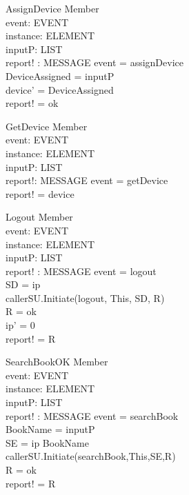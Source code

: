 \begin{schema}{AssignDevice}
\Delta Member \\ 
event: EVENT \\
instance: ELEMENT \\
inputP: LIST \\
report! : MESSAGE 
\where event = assignDevice \\
DeviceAssigned = \head inputP \\
device' = DeviceAssigned \\
report! = ok 
\end{schema}

\begin{schema}{GetDevice}
\Delta Member \\ 
event: EVENT \\
instance: ELEMENT \\
inputP: LIST \\
report!: MESSAGE
\where event = getDevice \\
report! = device 
\end{schema}

\begin{schema}{Logout}
\Delta Member \\ 
event: EVENT \\
instance: ELEMENT \\
inputP: LIST \\
report! : MESSAGE 
\where event = logout \\
SD = \lseq ip \rseq \\
callerSU.Initiate(logout, This, SD, R) \\
R = ok \\
ip' = 0 \\
report! = R 
\end{schema}

\begin{schema}{SearchBookOK}
\Xi Member \\
event: EVENT \\
instance: ELEMENT \\
inputP: LIST \\
report! : MESSAGE 
\where event = searchBook \\
BookName = \head inputP \\
SE = \lseq ip BookName \rseq \\
callerSU.Initiate(searchBook,This,SE,R) \\
R = ok \\
report! = R
\end{schema}

